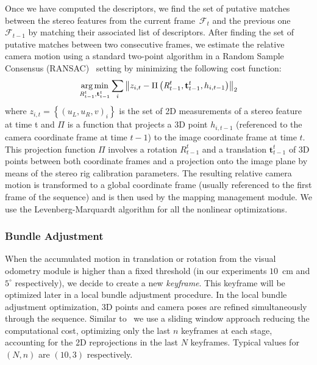 Once we have computed the descriptors, we find the set of putative matches between the stereo features from the current frame~$\mathcal{F}_{t}$ and the previous one~$\mathcal{F}_{t-1}$ by matching their associated list of descriptors. After finding the set of putative matches between two consecutive frames, we estimate the relative camera motion using a standard two-point algorithm in a Random Sample Consensus (RANSAC)~\cite{Bolles81ijcai} setting by minimizing the following cost function:
%
\begin{equation} \label{eq:three_pt}
\argmin_{\textit{R}_{t-1}^{t},\mathbf{t}_{t-1}^{t}} \sum\limits_{i} \left\| z_{i,t} - \Pi\left(\textit{R}_{t-1}^{t},\mathbf{t}_{t-1}^{t},h_{i,t-1}\right)\right\|_{2}
\end{equation}
%
where $z_{i,t}=\left\{\left(u_{L},u_{R},v\right)_{i}\right\}$ is the set of 2D measurements of a stereo feature at time t and $\Pi$ is a function that projects a 3D point $h_{i,t-1}$ (referenced to the camera coordinate frame at time $t-1$) to the image coordinate frame at time $t$. This projection function $\Pi$ involves a rotation $\textit{R}_{t-1}^{t}$ and a translation $\mathbf{t}_{t-1}^{t}$ of 3D
points between both coordinate frames and a projection onto the image plane by means of the stereo rig calibration parameters. The resulting relative camera motion is transformed to a global coordinate frame
(usually referenced to the first frame of the sequence) and is then used by the mapping management module. We use the Levenberg-Marquardt algorithm for all the nonlinear optimizations.

\subsubsection{Bundle Adjustment}\label{sec:ba}
When the accumulated motion in translation or rotation from the visual odometry module is higher than a fixed threshold (in our experiments $10$~cm and $5^{\circ}$ respectively), we decide to create a new \textit{keyframe}. This keyframe will be optimized later in a local bundle adjustment procedure. In the local bundle adjustment optimization, 3D points and camera poses are refined simultaneously through the sequence. Similar to~\cite{Mouragnon09ivc} we use a sliding window approach reducing the computational cost, optimizing only the last $n$ keyframes at each stage, accounting for the 2D reprojections in the last $N$ keyframes. Typical values for $\left(N,n\right)$ are $\left(10,3\right)$ respectively.

